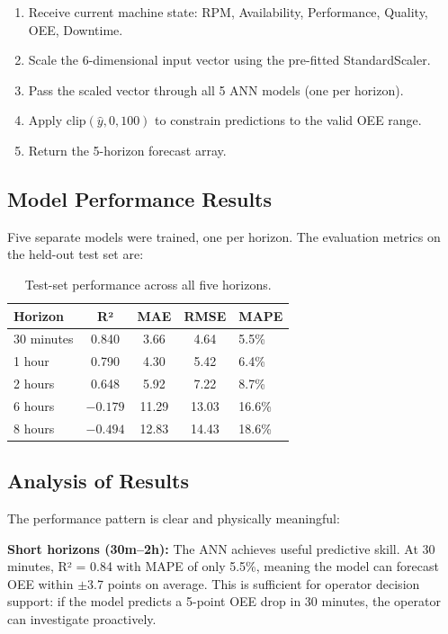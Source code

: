 \documentclass[a4paper,11pt]{article}
\begin{document}
\begin{enumerate}
    \item Receive current machine state: RPM, Availability, Performance, Quality, OEE, Downtime.
    \item Scale the 6-dimensional input vector using the pre-fitted StandardScaler.
    \item Pass the scaled vector through all 5 ANN models (one per horizon).
    \item Apply $\text{clip}(\hat{y}, 0, 100)$ to constrain predictions to the valid OEE range.
    \item Return the 5-horizon forecast array.
\end{enumerate}

\subsection{Model Performance Results}

Five separate models were trained, one per horizon. The evaluation metrics on the held-out test set are:

\begin{table}[h]
\centering
\begin{tabular}{@{}lcccl@{}}
\toprule
\textbf{Horizon} & \textbf{R²} & \textbf{MAE} & \textbf{RMSE} & \textbf{MAPE} \\
\midrule
30 minutes  & 0.840 & 3.66 & 4.64 & 5.5\% \\
1 hour      & 0.790 & 4.30 & 5.42 & 6.4\% \\
2 hours     & 0.648 & 5.92 & 7.22 & 8.7\% \\
6 hours     & $-0.179$ & 11.29 & 13.03 & 16.6\% \\
8 hours     & $-0.494$ & 12.83 & 14.43 & 18.6\% \\
\bottomrule
\end{tabular}
\caption{Test-set performance across all five horizons.}
\label{tab:results}
\end{table}

\subsection{Analysis of Results}

The performance pattern is clear and physically meaningful:

\textbf{Short horizons (30m--2h):} The ANN achieves useful predictive skill. At 30 minutes, R² = 0.84 with MAPE of only 5.5\%, meaning the model can forecast OEE within $\pm$3.7 points on average. This is sufficient for operator decision support: if the model predicts a 5-point OEE drop in 30 minutes, the operator can investigate proactively.
\end{document}
